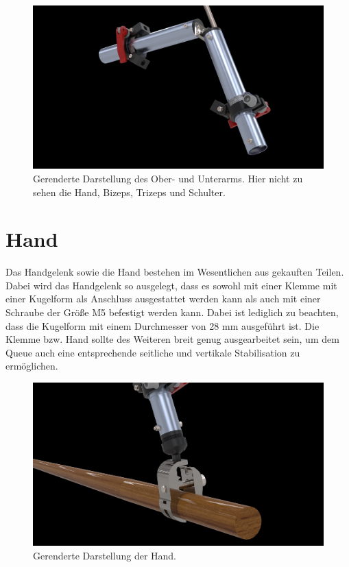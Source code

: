 		\begin{figure}[h]
			\centering
			\includegraphics[width=\textwidth]{Abb/CAD/Renderings/oberarm-unterarm.jpg}
			\caption[Gerenderte Darstellung des Ober- und Unterarms]{Gerenderte Darstellung des Ober- und Unterarms. Hier nicht zu sehen die Hand, Bizeps, Trizeps und Schulter.}%
			\label{fig:rendering hand}
		\end{figure}

	\section{Hand}
		Das Handgelenk sowie die Hand bestehen im Wesentlichen aus gekauften Teilen.
		Dabei wird das Handgelenk so ausgelegt, dass es sowohl mit einer Klemme mit einer Kugelform als Anschluss ausgestattet werden kann als auch mit einer Schraube der Größe M5 befestigt werden kann.
		Dabei ist lediglich zu beachten, dass die Kugelform mit einem Durchmesser von 28 mm ausgeführt ist.
		Die Klemme bzw. Hand sollte des Weiteren breit genug ausgearbeitet sein, um dem Queue auch eine entsprechende seitliche und vertikale Stabilisation zu ermöglichen.

		\begin{figure}[h]
			\centering
			\includegraphics[width=\textwidth]{Abb/CAD/Renderings/hand.jpg}
			\caption[Gerenderte Darstellung der Hand]{Gerenderte Darstellung der Hand.}%
			\label{fig:rendering hand}
		\end{figure}
	
